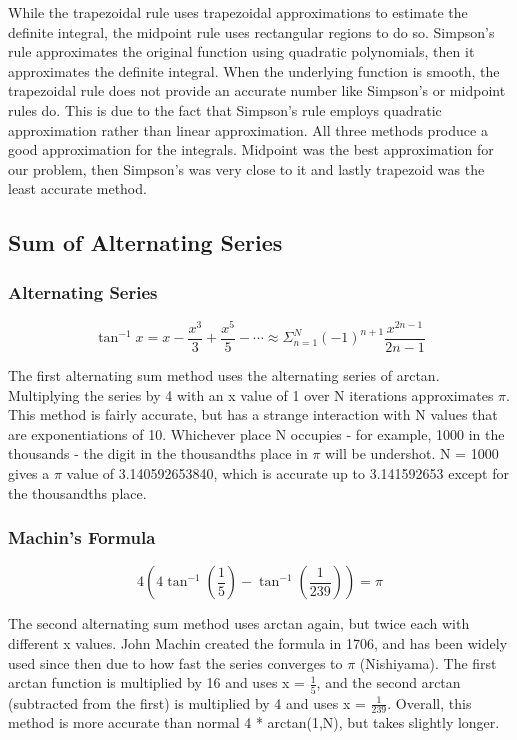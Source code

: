 \documentclass[11pt]{article}
\begin{document}
While the trapezoidal rule uses trapezoidal approximations to estimate the definite integral, the midpoint rule uses rectangular regions to do so. Simpson's rule approximates the original function using quadratic polynomials, then it approximates the definite integral.
When the underlying function is smooth, the trapezoidal rule does not provide an accurate number like Simpson’s or midpoint rules do. This is due to the fact that Simpson’s rule employs quadratic approximation rather than linear approximation. All three methods produce a good approximation for the integrals. Midpoint was the best approximation for our problem, then Simpson’s was very close to it and lastly trapezoid was the least accurate method.\\

\subsection{Sum of Alternating Series}\label{S:3.2}
\subsubsection*{Alternating Series}
\[\tan^{-1}x = x - \frac{x^3}{3} + \frac{x^5}{5} - \cdots \approx \Sigma_{n=1}^N(-1)^{n+1}\frac{x^{2n-1}}{2n-1}\]

The first alternating sum method uses  the alternating series of arctan. Multiplying the series by 4 with an x value of 1 over N iterations approximates $\pi$. This method is fairly accurate, but has a strange interaction with N values that are exponentiations of 10. Whichever place N occupies - for example, 1000 in the thousands - the digit in the thousandths place in $\pi$ will be undershot. N = 1000 gives a $\pi$ value of 3.140592653840, which is accurate up to 3.141592653 except for the thousandths place.\\

\subsubsection*{Machin's Formula}
\[4\left(4\tan^{-1}(\frac{1}{5})-\tan^{-1}(\frac{1}{239})\right) = \pi\]

The second alternating sum method uses arctan again, but twice each with different x values. John Machin created the formula in 1706, and has been widely used since then due to how fast the series converges to $\pi$ (Nishiyama). The first arctan function is multiplied by 16 and uses x = $\frac{1}{5}$, and the second arctan (subtracted from the first) is multiplied by 4 and uses x = $\frac{1}{239}$. Overall, this method is more accurate than normal 4 * arctan(1,N), but takes slightly longer.\\
\end{document}
